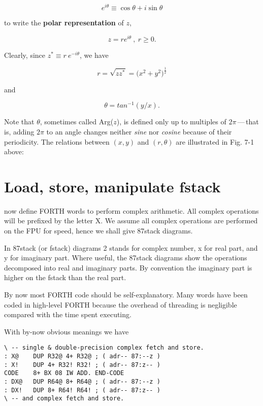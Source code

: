 \begin{equation}
  e^{i\theta} \equiv \cos \theta + i \sin \theta
\end{equation}

to write the \textbf{polar representation} of $z$,

\begin{equation}
  z = re^{i\theta}\ ,\ r \geq 0.
\end{equation}

Clearly, since $z^* \equiv r\ e^{-i\theta}$, we have

\begin{equation}
  r = \sqrt{zz^*} = \big(x^2 + y^2\big)^\frac{1}{2}
\end{equation}

and

\begin{equation}
  \theta = tan^{-1}(y/x).
\end{equation}

Note that $\theta$, sometimes called Arg($z$), is defined only up to multiples of $2\pi$\,---\,that is, adding $2\pi$ to an angle changes neither \textit{sine} nor \textit{cosine} because of their periodicity. The relations between $(x,y)$ and $(r,\theta)$ are illustrated in Fig. 7-1 above:

\section{Load, store, manipulate fstack}
 now define FORTH words to perform complex arithmetic. All complex operations will be prefixed by the letter X. We assume all complex operations are performed on the FPU for speed, hence we shall give 87stack diagrams.

In 87stack (or fstack) diagrams 2 stands for complex number, x for real part, and y for imaginary part. Where useful, the 87stack diagrams show the operations decomposed into real and imaginary parts. By convention the imaginary part is higher on the fstack than the real part.

By now most FORTH code should be self-explanatory. Many words have been coded in high-level FORTH because the overhead of threading is negligible compared with the time spent executing.

With by-now obvious meanings we have

\begin{lstlisting}
\ -- single & double-precision complex fetch and store.
: X@    DUP R32@ 4+ R32@ ; ( adr-- 87:--z )
: X!    DUP 4+ R32! R32! ; ( adr-- 87:z-- )
CODE    8+ BX 08 IW ADD. END-CODE
: DX@   DUP R64@ 8+ R64@ ; ( adr-- 87:--z )
: DX!   DUP 8+ R64! R64! ; ( adr-- 87:z-- )
\ -- and complex fetch and store.
\end{lstlisting}

